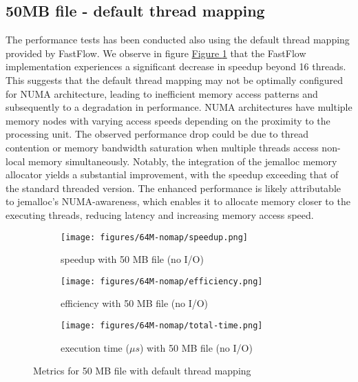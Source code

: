 \documentclass{article}
\begin{document}
\subsection{50MB file - default thread mapping}
The performance tests has been conducted also using the default thread mapping provided by FastFlow.
We observe in figure  \hyperref[fig:speedup-nomap]{Figure \ref*{fig:speedup-nomap}} that the FastFlow implementation experiences a significant decrease in speedup beyond 16 threads.
This suggests that the default thread mapping may not be optimally configured for NUMA architecture,
leading to inefficient memory access patterns and subsequently to a degradation in performance.
NUMA architectures have multiple memory nodes with varying access speeds depending on the proximity to the processing unit.
The observed performance drop could be due to thread contention or memory bandwidth saturation when multiple threads access
non-local memory simultaneously.
Notably, the integration of the jemalloc memory allocator yields a substantial improvement,
with the speedup exceeding that of the standard threaded version.
The enhanced performance is likely attributable to jemalloc's NUMA-awareness,
which enables it to allocate memory closer to the executing threads, reducing latency and increasing memory access speed.

\begin{figure}
    \begin{subfigure}{0.6\textwidth}
        \centering
        \texttt{[image: figures/64M-nomap/speedup.png]}
        \caption{speedup with 50 MB file (no I/O)}
        \label{fig:speedup-nomap}
    \end{subfigure}
    \begin{subfigure}{0.6\textwidth}
        \centering
        \texttt{[image: figures/64M-nomap/efficiency.png]}
        \caption{efficiency with 50 MB file (no I/O)}
        \label{fig:efficiency-nomap}
    \end{subfigure}
    \begin {subfigure}{0.6\textwidth}
        \centering
        \texttt{[image: figures/64M-nomap/total-time.png]}
        \caption{execution time ($\mu s$) with 50 MB file (no I/O)}
        \label{fig:total-time-nomap}
    \end{subfigure}
    \caption{Metrics for 50 MB file with default thread mapping}
    \label{fig:50mb-nomap}
\end{figure}
\end{document}
